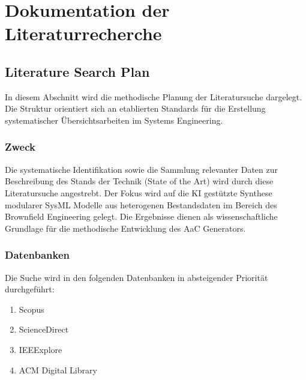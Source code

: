 \section{Dokumentation der Literaturrecherche}
\label{app:literaturrecherche}

\subsection{Literature Search Plan}
\label{app:lsp}



In diesem Abschnitt wird die methodische Planung der Literatursuche dargelegt. Die Struktur orientiert sich an etablierten Standards für die Erstellung systematischer Übersichtsarbeiten im Systems Engineering.

\subsubsection{Zweck}

Die systematische Identifikation sowie die Sammlung relevanter Daten zur Beschreibung des Stands der Technik (State of the Art) wird durch diese Literatursuche angestrebt. Der Fokus wird auf die KI gestützte Synthese modularer SysML Modelle aus heterogenen Bestandsdaten im Bereich des Brownfield Engineering gelegt. Die Ergebnisse dienen als wissenschaftliche Grundlage für die methodische Entwicklung des AaC Generators.

\subsubsection{Datenbanken}

Die Suche wird in den folgenden Datenbanken in absteigender Priorität durchgeführt:
\begin{enumerate}
    \item Scopus
    \item ScienceDirect
    \item IEEExplore
    \item ACM Digital Library
\end{enumerate}

